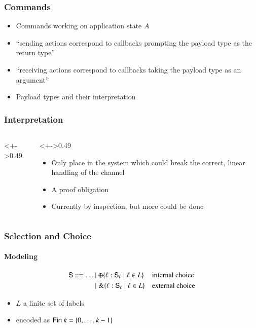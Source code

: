 \documentclass[dvipsnames,aspectratio=169,pdftex]{beamer}
\begin{document}
\begin{frame}
  \frametitle{Commands}
  \begin{itemize}
  \item Commands working on application state $A$ 
    \stCommand
  \item ``sending actions correspond to callbacks prompting the
    payload type as the return type''
  \item ``receiving actions correspond to callbacks taking the payload
    type as an argument''
  \item Payload types and their interpretation
    \stTypeInterpretation
  \end{itemize}
\end{frame}
\begin{frame}
  \frametitle{Interpretation}
  \begin{columns}
    \begin{column}<+->{0.49\textwidth}
      \stExecutorSignature\vspace{-2\baselineskip} \stExecutor
    \end{column}
    \begin{column}<+->{0.49\textwidth}
      \begin{itemize}
      \item Only place in the system which could break the correct,
        linear handling of the channel
      \item A proof obligation
      \item Currently by inspection, but more could be done
      \end{itemize}
    \end{column}
  \end{columns}
\end{frame}
\begin{frame}
  \frametitle{Selection and Choice}
  \framesubtitle{Modeling}
  \begin{align*}
    \AS  ::= \dots 
      & \mid \oplus\{ \ell : \AS_\ell \mid \ell \in L \}
      && \text{internal choice} \\
      & \mid
        \&\{\ell: \AS_\ell \mid \ell \in L\}
      && \text{external choice}
  \end{align*}
  \begin{itemize}
  \item $L$ a finite set of labels
  \item encoded as $\AFin~k = \{0, \dots, k-1\}$
  \end{itemize}
  \stBranchingType
  \stBranchingCommand
\end{frame}
\end{document}
